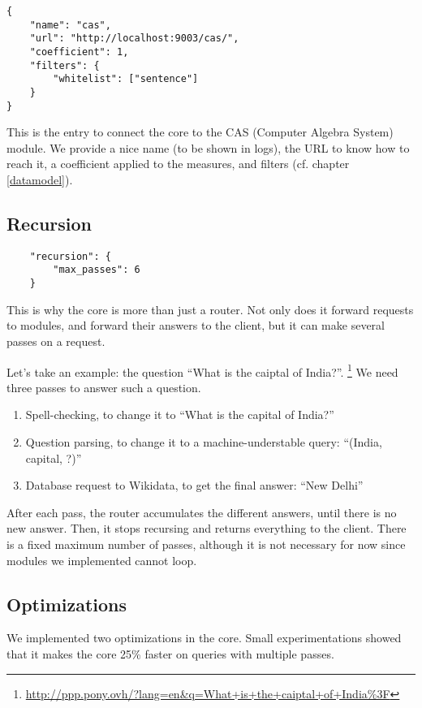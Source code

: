 \begin{verbatim}
{
    "name": "cas",
    "url": "http://localhost:9003/cas/",
    "coefficient": 1,
    "filters": {
        "whitelist": ["sentence"]
    }
}
\end{verbatim}

This is the entry to connect the core to the CAS (Computer Algebra System)
module. We provide a nice name (to be
shown in logs), the URL to know how to reach it, a coefficient applied to
the measures, and filters (cf. chapter \ref{datamodel}).

\subsection{Recursion}

\begin{verbatim}
    "recursion": {
        "max_passes": 6
    }
\end{verbatim}

This is why the core is more than just a router. Not only does it forward
requests to modules, and forward their answers to the client, but it can
make several passes on a request.

Let's take an example: the question “What is the caiptal of India?”.
\footnote{\url{http://ppp.pony.ovh/?lang=en&q=What+is+the+caiptal+of+India\%3F}}
We need three passes to answer such a question.

\begin{enumerate}
    \item Spell-checking, to change it to “What is the capital of India?”
    \item Question parsing, to change it to a machine-understable query:
        “(India, capital, ?)”
    \item Database request to Wikidata, to get the final answer:
        “New Delhi”
\end{enumerate}

After each pass, the router accumulates the different answers, until
there is no new answer. Then, it stops recursing and returns everything
to the client.
There is a fixed maximum number of passes, although it is not necessary
for now since modules we implemented cannot loop.

\subsection{Optimizations}

We implemented two optimizations in the core. Small experimentations showed that
it makes the core 25\% faster on queries with multiple passes.

